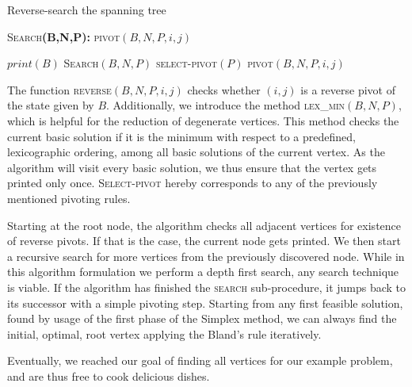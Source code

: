 \documentclass[a4paper, 11pt]{article}
\begin{document}
\begin{algorithm}[H]
	\caption{Reverse-search the spanning tree}
	\label{alg:seq}
	\begin{algorithmic}[1]
		\STATE \textsc{Search}\textbf{(B,N,P):}
		\STATE \textsc{pivot}$(B,N,P,i,j)$
		
		\STATE $print(B)$
		\ENDIF
		\STATE \textsc{Search}$(B,N,P)$
		\STATE \textsc{select-pivot}$(P)$
		\STATE \textsc{pivot}$(B,N,P,i,j)$
		
		\ENDIF
		\ENDFOR
	\end{algorithmic}
\end{algorithm}

The function \textsc{reverse}$(B,N,P,i,j)$ checks  whether $(i,j)$ is a reverse pivot of the state given by $B$. Additionally, we introduce the method \textsc{lex\_min}$(B,N,P)$, which is helpful for the reduction of degenerate vertices. This method checks the current basic solution if it is the minimum with respect to a predefined, lexicographic ordering, among all basic solutions of the current vertex. As the algorithm will visit every basic solution, we thus ensure that the vertex gets printed only once. \textsc{Select-pivot} hereby corresponds to any of the previously mentioned pivoting rules.\medskip 

Starting at the root node, the algorithm checks all adjacent vertices for existence of reverse pivots. If that is the case, the current node gets printed. We then start a recursive search for more vertices from the previously discovered node. While in this algorithm formulation we perform a depth first search, any search technique is viable. If the algorithm has finished the \textsc{search} sub-procedure, it jumps back to its successor with a simple pivoting step. Starting from any first feasible solution, found by usage of the first phase of the Simplex method, we can always find the initial, optimal, root vertex applying the Bland's rule iteratively.\medskip

Eventually, we reached our goal of finding all vertices for our example problem, and are thus free to cook delicious dishes. 
\end{document}
